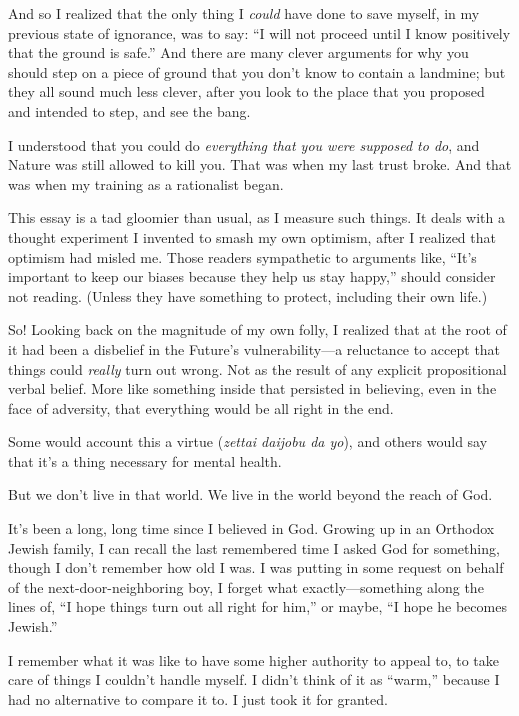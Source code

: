 {
 And so I realized that the only thing I \textit{could} have done
to save myself, in my previous state of ignorance, was to say:
``I will not proceed until I know positively that the
ground is safe.'' And there are many clever arguments
for why you should step on a piece of ground that you
don't know to contain a landmine; but they all sound
much less clever, after you look to the place that you proposed and
intended to step, and see the bang.}

{
 I understood that you could do \textit{everything that you were
supposed to do}, and Nature was still allowed to kill you. That was
when my last trust broke. And that was when my training as a
rationalist began.}

\myendsectiontext


{
 This essay is a tad gloomier than usual, as I measure such things.
It deals with a thought experiment I invented to smash my own optimism,
after I realized that optimism had misled me. Those readers sympathetic
to arguments like, ``It's important to
keep our biases because they help us stay happy,''
should consider not reading. (Unless they have something to protect,
including their own life.) }

{
 So! Looking back on the magnitude of my own folly, I realized that
at the root of it had been a disbelief in the Future's
vulnerability---a reluctance to accept that things could
\textit{really} turn out wrong. Not as the result of any explicit
propositional verbal belief. More like something inside that persisted
in believing, even in the face of adversity, that everything would be
all right in the end.}

{
 Some would account this a virtue (\textit{zettai daijobu da yo}),
and others would say that it's a thing necessary for
mental health.}

{
 But we don't live in that world. We live in the
world beyond the reach of God.}

{
 It's been a long, long time since I believed in
God. Growing up in an Orthodox Jewish family, I can recall the last
remembered time I asked God for something, though I
don't remember how old I was. I was putting in some
request on behalf of the next-door-neighboring boy, I forget what
exactly---something along the lines of, ``I hope
things turn out all right for him,'' or maybe,
``I hope he becomes Jewish.''}

{
 I remember what it was like to have some higher authority to
appeal to, to take care of things I couldn't handle
myself. I didn't think of it as
``warm,'' because I had no
alternative to compare it to. I just took it for granted.}

